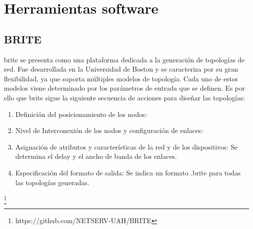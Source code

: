 \section{Herramientas software}
\label{sec:software}

\subsection{BRITE}

\gls{brite} \cite{brite} se presenta como una plataforma dedicada a la generación de topologías de red. Fue desarrollada en la Universidad de Boston y se caracteriza por su gran flexibilidad, ya que soporta múltiples modelos de topología. Cada uno de estos modelos viene determinado por los parámetros de entrada que se definen. Es por ello que \gls{brite} sigue la siguiente secuencia de acciones para diseñar las topologías:

\begin{enumerate}
    \item Definición del posicionamiento de los nodos:
    \item Nivel de Interconexión de los nodos y configuración de enlaces:
    \item Asignación de atributos y características de la red y de los dispositivos: Se determina el delay y el ancho de banda de los enlaces.
    \item Especificación del formato de salida: Se indica un formato .brite para todas las topologías generadas.
\end{enumerate}

\footnote{https://github.com/NETSERV-UAH/BRITE}










